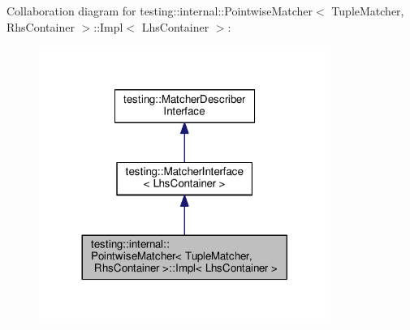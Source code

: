 Collaboration diagram for testing\+:\+:internal\+:\+:Pointwise\+Matcher$<$ Tuple\+Matcher, Rhs\+Container $>$\+:\+:Impl$<$ Lhs\+Container $>$\+:
\nopagebreak
\begin{figure}[H]
\begin{center}
\leavevmode
\includegraphics[width=269pt]{classtesting_1_1internal_1_1_pointwise_matcher_1_1_impl__coll__graph}
\end{center}
\end{figure}

